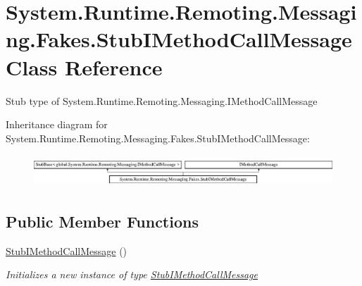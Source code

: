 \hypertarget{class_system_1_1_runtime_1_1_remoting_1_1_messaging_1_1_fakes_1_1_stub_i_method_call_message}{\section{System.\-Runtime.\-Remoting.\-Messaging.\-Fakes.\-Stub\-I\-Method\-Call\-Message Class Reference}
\label{class_system_1_1_runtime_1_1_remoting_1_1_messaging_1_1_fakes_1_1_stub_i_method_call_message}
}


Stub type of System.\-Runtime.\-Remoting.\-Messaging.\-I\-Method\-Call\-Message 


Inheritance diagram for System.\-Runtime.\-Remoting.\-Messaging.\-Fakes.\-Stub\-I\-Method\-Call\-Message\-:\begin{figure}[H]
\begin{center}
\leavevmode
\includegraphics[height=1.204301cm]{class_system_1_1_runtime_1_1_remoting_1_1_messaging_1_1_fakes_1_1_stub_i_method_call_message}
\end{center}
\end{figure}
\subsection*{Public Member Functions}
\begin{DoxyCompactItemize}
\item 
\hyperlink{class_system_1_1_runtime_1_1_remoting_1_1_messaging_1_1_fakes_1_1_stub_i_method_call_message_a3f993d4806edfb4d25de681b2e4cfdbe}{Stub\-I\-Method\-Call\-Message} ()
\begin{DoxyCompactList}\small\item\em Initializes a new instance of type \hyperlink{class_system_1_1_runtime_1_1_remoting_1_1_messaging_1_1_fakes_1_1_stub_i_method_call_message}{Stub\-I\-Method\-Call\-Message}\end{DoxyCompactList}\end{DoxyCompactItemize}

